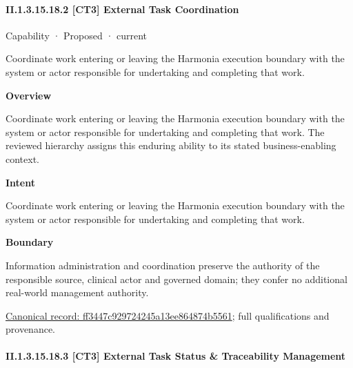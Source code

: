 \paragraph*{II.1.3.15.18.2 [CT3] External Task Coordination}
\label{navigation:II.1.3.15.18.2}

\label{element:ff3447c929724245a13ee864874b5561}
{\small Capability · Proposed · current}\par

Coordinate work entering or leaving the Harmonia execution boundary with the system or actor responsible for undertaking and completing that work.



\textbf{Overview}



Coordinate work entering or leaving the Harmonia execution boundary with the system or actor responsible for undertaking and completing that work. The reviewed hierarchy assigns this enduring ability to its stated business-enabling context.



\textbf{Intent}



Coordinate work entering or leaving the Harmonia execution boundary with the system or actor responsible for undertaking and completing that work.



\textbf{Boundary}



Information administration and coordination preserve the authority of the responsible source, clinical actor and governed domain; they confer no additional real-world management authority.


{\footnotesize \href{../../../../continuum/strategy/capability/ff3447c929724245a13ee864874b5561.md}{Canonical record: ff3447c929724245a13ee864874b5561}; full qualifications and provenance.}\par
\paragraph*{II.1.3.15.18.3 [CT3] External Task Status \& Traceability Management}
\label{navigation:II.1.3.15.18.3}

